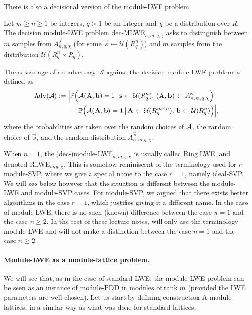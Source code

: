 There is also a decisional version of the module-LWE problem.

\begin{definition}
Let $m \geq n \geq 1$ be integers, $q >1$ be an integer and $\chi$ be a distribution over $R$. The decision module-LWE problem dec-MLWE$_{n,m,q,\chi}$ asks to distinguish between $m$ samples from $A^{\vec s}_{n,q,\chi}$ (for some $\vec s \leftarrow \mathcal{U}(R_q^n)$) and $m$ samples from the distribution $\mathcal{U}(R_q^n \times R_q)$.

The advantage of an adversary $\mathcal{A}$ against the decision module-LWE problem is defined as
\begin{align*} \operatorname{Adv}(\mathcal{A}) := \Big| &\mathbb{P}\Big(\mathcal{A}(\mathbf A, \mathbf b) = 1\,\big|\, \mathbf s \leftarrow \mathcal{U}(R_q^n),\, (\mathbf A, \mathbf b) \leftarrow A^{\mathbf s}_{n,m,q,\chi}\Big) \\
&- \mathbb{P}\Big(\mathcal{A}(\mathbf A, \mathbf b) = 1\,\big|\, \mathbf A \leftarrow \mathcal{U}(R_q^{m \times n}), \, \mathbf b \leftarrow \mathcal{U}(R_q^n)\Big) \Big|,
\end{align*}
where the probabilities are taken over the random choices of $\mathcal{A}$, the random choice of $\vec s$, and the random distribution $A^{\vec s}_{n,m,q,\chi}$.
\end{definition}

When $n = 1$, the (dec-)module-LWE$_{n,m,q,\chi}$ is usually called Ring LWE, and denoted RLWE$_{m,q,\chi}$.
This is somehow reminiscent of the terminology used for $r$-module-SVP, where we give a special name to the case $r = 1$, namely ideal-SVP.
We will see below however that the situation is different between the module-LWE and module-SVP cases. For module-SVP, we argued that there exists better algorithms in the case $r = 1$, which justifies giving it a different name. In the case of module-LWE, there is no such (known) difference between the case $n = 1$ and the case $n \geq 2$. In the rest of these lecture notes, will only use the terminology module-LWE and will not make a distinction between the case $n = 1$ and the case $n \geq 2$.

\paragraph{Module-LWE as a module-lattice problem.} We will see that, as in the case of standard LWE, the module-LWE problem can be seen as an instance of module-BDD in modules of rank $m$ (provided the LWE parameters are well chosen).
Let us start by defining construction A module-lattices, in a similar way as what was done for standard lattices.

